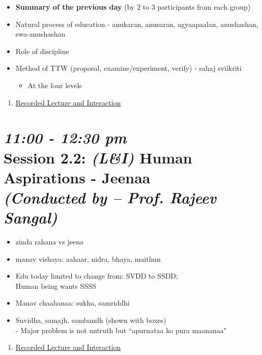\documentclass[11pt]{article}
\begin{document}
    \begin{itemize}
        \item {\bf Summary of the previous day} (by 2 to 3 participants from each group)
        \item Natural process of education - anukaran, anusaran, agyaapaalan, anushashan, swa-anushashan
        \item Role of discipline
        \item Method of TTW (proposal, examine/experiment, verify) - sahaj sviikriti
        \begin{itemize}
            \item At the four levels
        \end{itemize}
    \end{itemize}

    \begin{enumerate}
        \item \href{https://www.youtube.com/watch?v=_18Wm4mP9DQ}{Recorded Lecture and Interaction}
    \end{enumerate}

    \section*{{\it 11:00 - 12:30 pm} \\
    Session 2.2: {\it (L\&I)} Human Aspirations - Jeenaa \\
    {\Large\it (Conducted by -- Prof. Rajeev Sangal)}}

    \begin{itemize}
        \item zinda rahana vs jeena
        \item manav vishaya: aahaar, nidra, bhaya, maithun
        \item Edu today limited to change from: SVDD to SSDD;\\
        Human being wants SSSS
        \item Manav chaahanaa: sukha, samriddhi
        \vspace{5mm}
        \item Suvidha, samajh, sambandh (shown with boxes)\\
        - Major problem is not untruth but ``apurnataa ko pura maananaa"
    \end{itemize}

    \begin{enumerate}
        \item \href{https://www.youtube.com/watch?v=f8SHUIFvRjE}{Recorded Lecture and Interaction}
    \end{enumerate}
\end{document}
